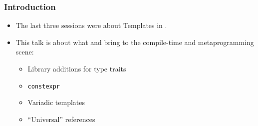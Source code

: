 \begin{frame}[fragile,t]
\frametitle{Introduction}
\begin{itemize}[<+->]
\item The last three sessions were about Templates in .
\vskip 12pt
\item This talk is about what  and  bring to the
  compile-time and metaprogramming scene:

\begin{itemize}
  \item Library additions for type traits
  \item \texttt{constexpr}
  \item Variadic templates
  \item ``Universal'' references
\end{itemize}
\end{itemize}


\end{frame}

